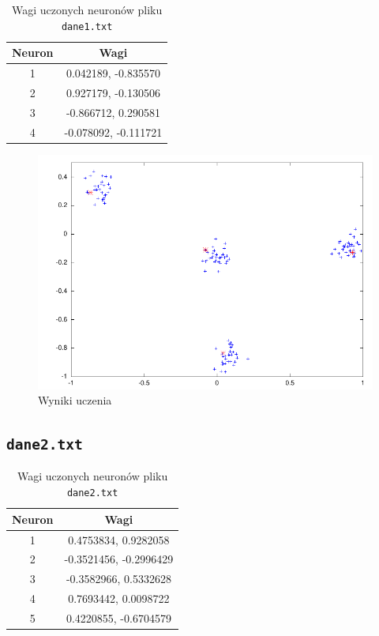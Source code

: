 \documentclass[pointlessnumbers, abstracton, headsepline, a4paper]{scrartcl}
\begin{document}
\begin{table}[h]
\centering
\begin{tabular}[t]{c|c}
Neuron & Wagi \\
\hline
1 &   0.042189, -0.835570 \\
2 &   0.927179, -0.130506 \\
3 &  -0.866712,  0.290581 \\
4 &  -0.078092, -0.111721 \\
\end{tabular}
\caption{\label{tab:xor}Wagi uczonych neuronów pliku \texttt{dane1.txt}}
\end{table}

\begin{figure}[!h]
\centering
\includegraphics[scale=1.0]{src/mydane1.pdf}\caption{\label{fig:dane1}Wyniki uczenia}
\end{figure}

\clearpage
\subsection{\texttt{dane2.txt}}

\begin{table}[h]
\centering
\begin{tabular}[t]{c|c}
Neuron & Wagi \\
\hline
1& 0.4753834,  0.9282058 \\
2&-0.3521456, -0.2996429 \\
3&-0.3582966,  0.5332628 \\
4& 0.7693442,  0.0098722 \\
5& 0.4220855, -0.6704579 \\
\end{tabular}
\caption{\label{tab:xor}Wagi uczonych neuronów pliku \texttt{dane2.txt}}
\end{table}
\end{document}
